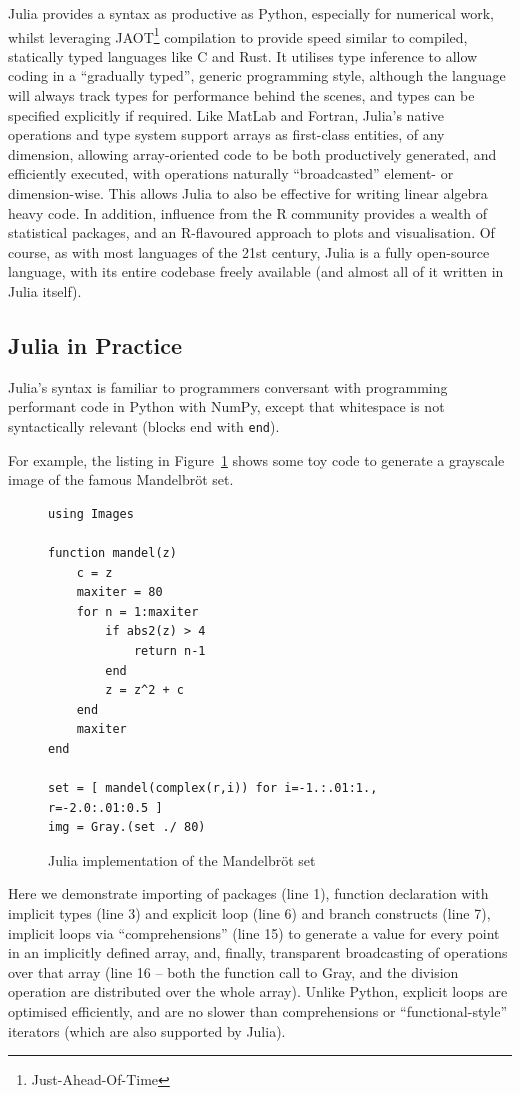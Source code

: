 \documentclass{webofc}
\begin{document}
Julia provides a syntax as productive as Python, especially for numerical work,
whilst leveraging JAOT\footnote{Just-Ahead-Of-Time} compilation to provide speed
similar to compiled, statically typed languages like C and Rust. It utilises
type inference to allow coding in a ``gradually typed'', generic programming
style, although the language will always track types for performance behind the
scenes, and types can be specified explicitly if required. Like MatLab and
Fortran, Julia's native operations and type system support arrays as first-class
entities, of any dimension, allowing array-oriented code to be both productively
generated, and efficiently executed, with operations naturally ``broadcasted''
element- or dimension-wise. This allows Julia to also be effective for writing
linear algebra heavy code. In addition, influence from the R community provides
a wealth of statistical packages, and an R-flavoured approach to plots and
visualisation. Of course, as with most languages of the 21st century, Julia is a
fully open-source language, with its entire codebase freely available (and
almost all of it written in Julia itself).

\subsection{Julia in Practice}

Julia's syntax is familiar to programmers conversant with programming performant
code in Python with NumPy, except that whitespace is not syntactically relevant
(blocks end with \texttt{end}).

For example, the listing in Figure~\ref{code:madelbrot} shows some toy code to
generate a grayscale image of the famous Mandelbröt set.

\begin{figure}[!ht]
\centering
\begin{verbatim}
using Images

function mandel(z)
    c = z
    maxiter = 80
    for n = 1:maxiter
        if abs2(z) > 4
            return n-1
        end
        z = z^2 + c
    end
    maxiter
end

set = [ mandel(complex(r,i)) for i=-1.:.01:1., r=-2.0:.01:0.5 ]
img = Gray.(set ./ 80)
\end{verbatim}
\caption{Julia implementation of the Mandelbr\"{o}t set}
\label{code:madelbrot}
\end{figure}

Here we demonstrate importing of packages (line 1), function declaration with
implicit types (line 3) and explicit loop (line 6) and branch constructs (line
7), implicit loops via ``comprehensions'' (line 15) to generate a  value for
every point in an implicitly defined array, and, finally, transparent
broadcasting of operations over that array (line 16 -- both the function call to
Gray, and the division operation are distributed over the whole array). Unlike
Python, explicit loops are optimised efficiently, and are no slower than
comprehensions or ``functional-style'' iterators (which are also supported by
Julia).
\end{document}
